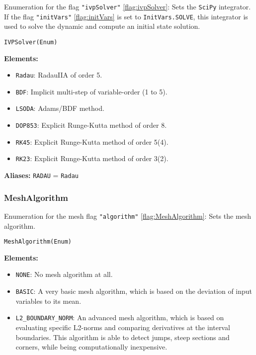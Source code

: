 \documentclass[12pt]{article}
\begin{document}
\begin{mdframed}[backgroundcolor=gray!10, roundcorner=10pt,
		linewidth=1pt]
	Enumeration for the flag \texttt{"ivpSolver"}
	\eqref{flag:ivpSolver}:
	Sets the \texttt{SciPy} integrator. If the flag
	\texttt{"initVars"} \eqref{flag:initVars} is set to
	\texttt{InitVars.SOLVE}, this
	integrator is used to solve the dynamic and compute an initial state
	solution.

	\begin{lstlisting}
IVPSolver(Enum)
		\end{lstlisting}
	\label{enum:IVPSolver}
	\textbf{Elements:}
	\begin{itemize}
		\item \texttt{Radau}: RadauIIA of order 5.
		\item \texttt{BDF}: Implicit multi-step of
		      variable-order (1 to 5).
		\item \texttt{LSODA}: Adams/BDF method.
		\item \texttt{DOP853}: Explicit Runge-Kutta method of
		      order 8.
		\item \texttt{RK45}: Explicit Runge-Kutta method of
		      order 5(4).
		\item \texttt{RK23}: Explicit Runge-Kutta method of
		      order 3(2).
	\end{itemize}

	\textbf{Aliases:} \texttt{RADAU} = \texttt{Radau}
\end{mdframed}

\subsubsection{MeshAlgorithm}

\begin{mdframed}[backgroundcolor=gray!10, roundcorner=10pt,
		linewidth=1pt]
	Enumeration for the mesh flag \texttt{"algorithm"}
	\eqref{flag:MeshAlgorithm}:
	Sets the mesh algorithm.

	\begin{lstlisting}
MeshAlgorithm(Enum)
		\end{lstlisting}
	\label{enum:MeshAlgorithm}
	\textbf{Elements:}
	\begin{itemize}
		\item \texttt{NONE}: No mesh algorithm at all.
		\item \texttt{BASIC}: A very basic mesh algorithm, which is
		      based on the deviation of input variables to its mean.
		\item \texttt{L2\_BOUNDARY\_NORM}: An advanced mesh algorithm,
		      which is based on evaluating specific L2-norms and
		      comparing derivatives at the
		      interval boundaries. This algorithm is able to detect
		      jumps, steep sections and
		      corners, while being
		      computationally inexpensive.
	\end{itemize}

\end{mdframed}
\end{document}
